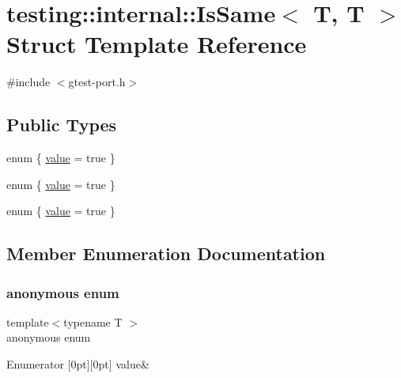 \hypertarget{structtesting_1_1internal_1_1_is_same_3_01_t_00_01_t_01_4}{}\section{testing\+::internal\+::Is\+Same$<$ T, T $>$ Struct Template Reference}
\label{structtesting_1_1internal_1_1_is_same_3_01_t_00_01_t_01_4}


{\ttfamily \#include $<$gtest-\/port.\+h$>$}

\subsection*{Public Types}
\begin{DoxyCompactItemize}
\item 
enum \{ \mbox{\hyperlink{structtesting_1_1internal_1_1_is_same_3_01_t_00_01_t_01_4_a7542ab96b5dce9fd030e8582cd722a2ba54c7af2031ab78f1d6b0930425b5c5a9}{value}} = true
 \}
\item 
enum \{ \mbox{\hyperlink{structtesting_1_1internal_1_1_is_same_3_01_t_00_01_t_01_4_a7542ab96b5dce9fd030e8582cd722a2ba54c7af2031ab78f1d6b0930425b5c5a9}{value}} = true
 \}
\item 
enum \{ \mbox{\hyperlink{structtesting_1_1internal_1_1_is_same_3_01_t_00_01_t_01_4_a7542ab96b5dce9fd030e8582cd722a2ba54c7af2031ab78f1d6b0930425b5c5a9}{value}} = true
 \}
\end{DoxyCompactItemize}


\subsection{Member Enumeration Documentation}
\mbox{\label{structtesting_1_1internal_1_1_is_same_3_01_t_00_01_t_01_4_a3346defc577383d133655e0ae4ba4d6f}} 
\subsubsection{\texorpdfstring{anonymous enum}{anonymous enum}}
{\footnotesize\ttfamily template$<$typename T $>$ \\
anonymous enum}

\begin{DoxyEnumFields}{Enumerator}
[0pt][0pt]{}\mbox{\label{structtesting_1_1internal_1_1_is_same_3_01_t_00_01_t_01_4_a7542ab96b5dce9fd030e8582cd722a2ba54c7af2031ab78f1d6b0930425b5c5a9}} 
value&\\
\hline

\end{DoxyEnumFields}
\mbox{\label{structtesting_1_1internal_1_1_is_same_3_01_t_00_01_t_01_4_a7542ab96b5dce9fd030e8582cd722a2b}} 
